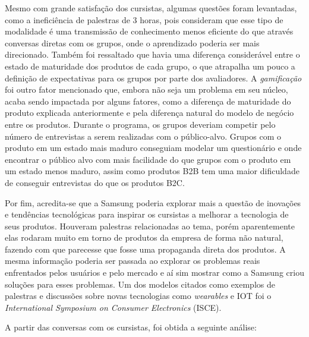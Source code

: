 Mesmo com grande satisfação dos cursistas, algumas questões foram levantadas, como a ineficiência de palestras de 3 horas, pois consideram que esse tipo de modalidade é uma transmissão de conhecimento menos eficiente do que através conversas diretas com os grupos, onde o aprendizado poderia ser mais direcionado. Também foi ressaltado que havia uma diferença considerável entre o estado de maturidade dos produtos de cada grupo, o que atrapalha um pouco a definição de expectativas para os grupos por parte dos avaliadores. A \textit{gamificação} foi outro fator mencionado que, embora não seja um problema em seu núcleo, acaba sendo impactada por alguns fatores, como a diferença de maturidade do produto explicada anteriormente e pela diferença natural do modelo de negócio entre os produtos. Durante o programa, os grupos deveriam competir pelo número de entrevistas a serem realizadas com o público-alvo. Grupos com o produto em um estado mais maduro conseguiam modelar um questionário e onde encontrar o público alvo com mais facilidade do que grupos com o produto em um estado menos maduro, assim como produtos B2B tem uma maior dificuldade de conseguir entrevistas do que os produtos B2C. 

Por fim, acredita-se que a Samsung poderia explorar mais a questão de inovações e tendências tecnológicas para inspirar os cursistas a melhorar a tecnologia de seus produtos. Houveram palestras relacionadas ao tema, porém aparentemente elas rodaram muito em torno de produtos da empresa de forma não natural, fazendo com que parecesse que fosse uma propaganda direta dos produtos. A mesma informação poderia ser passada ao explorar os problemas reais enfrentados pelos usuários e pelo mercado e aí sim mostrar como a Samsung criou soluções para esses problemas. Um dos modelos citados como exemplos de palestras e discussões sobre novas tecnologias como \textit{wearables} e IOT foi o \textit{International Symposium on Consumer Electronics} (ISCE).

A partir das conversas com os cursistas, foi obtida a seguinte análise:

